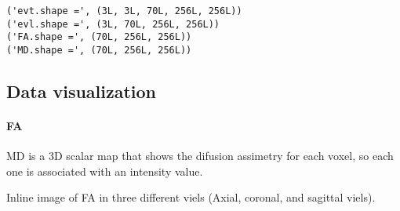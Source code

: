 \documentclass{article}
\begin{document}
    \begin{Verbatim}[commandchars=\\\{\}]
('evt.shape =', (3L, 3L, 70L, 256L, 256L))
('evl.shape =', (3L, 70L, 256L, 256L))
('FA.shape =', (70L, 256L, 256L))
('MD.shape =', (70L, 256L, 256L))
    \end{Verbatim}

    \subsection{Data visualization}\label{data-visualization}

\paragraph{FA}\label{fa}

MD is a 3D scalar map that shows the difusion assimetry for each voxel,
so each one is associated with an intensity value.

Inline image of FA in three different viels (Axial, coronal, and
sagittal viels).
\end{document}
